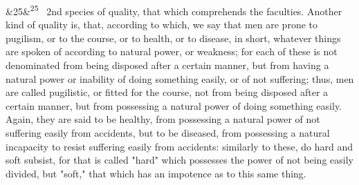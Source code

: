 \documentclass[12pt]{article}
\newcommand{\para}[1][]{\par\noindent\ifx&#1&\else\textsuperscript{\footnotesize #1}~\fi}
\begin{document}
\para[25] 2nd species of quality, that which comprehends the faculties. Another kind of quality is, that, according to which, we say that men are prone to pugilism, or to the course, or to health, or to disease, in short, whatever things are spoken of according to natural power, or weakness; for each of these is not denominated from being disposed after a certain manner, but from having a natural power or inability of doing something easily, or of not suffering; thus, men are called pugilistic, or fitted for the course, not from being disposed after a certain manner, but from possessing a natural power of doing something easily. Again, they are said to be healthy, from possessing a natural power of not suffering easily from accidents, but to be diseased, from possessing a natural incapacity to resist suffering easily from accidents: similarly to these, do hard and soft subsist, for that is called "hard" which possesses the power of not being easily divided, but "soft," that which has an impotence as to this same thing.
\end{document}
